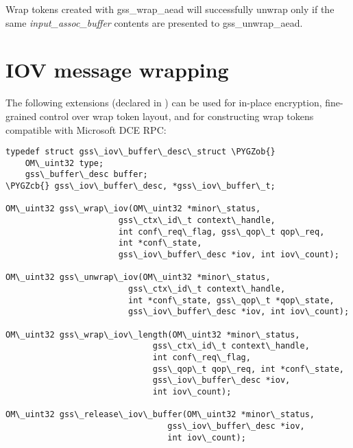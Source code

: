 \documentclass[letterpaper,10pt,english]{sphinxmanual}
\def\PYGZob{\char`\{}
\def\PYGZcb{\char`\}}
\begin{document}
Wrap tokens created with gss\_wrap\_aead will successfully unwrap only
if the same \emph{input\_assoc\_buffer} contents are presented to
gss\_unwrap\_aead.


\section{IOV message wrapping}
\label{appdev/gssapi:iov-message-wrapping}
The following extensions (declared in ) can
be used for in-place encryption, fine-grained control over wrap token
layout, and for constructing wrap tokens compatible with Microsoft DCE
RPC:

\begin{Verbatim}[commandchars=\\\{\}]
typedef struct gss\_iov\_buffer\_desc\_struct \PYGZob{}
    OM\_uint32 type;
    gss\_buffer\_desc buffer;
\PYGZcb{} gss\_iov\_buffer\_desc, *gss\_iov\_buffer\_t;

OM\_uint32 gss\_wrap\_iov(OM\_uint32 *minor\_status,
                       gss\_ctx\_id\_t context\_handle,
                       int conf\_req\_flag, gss\_qop\_t qop\_req,
                       int *conf\_state,
                       gss\_iov\_buffer\_desc *iov, int iov\_count);

OM\_uint32 gss\_unwrap\_iov(OM\_uint32 *minor\_status,
                         gss\_ctx\_id\_t context\_handle,
                         int *conf\_state, gss\_qop\_t *qop\_state,
                         gss\_iov\_buffer\_desc *iov, int iov\_count);

OM\_uint32 gss\_wrap\_iov\_length(OM\_uint32 *minor\_status,
                              gss\_ctx\_id\_t context\_handle,
                              int conf\_req\_flag,
                              gss\_qop\_t qop\_req, int *conf\_state,
                              gss\_iov\_buffer\_desc *iov,
                              int iov\_count);

OM\_uint32 gss\_release\_iov\_buffer(OM\_uint32 *minor\_status,
                                 gss\_iov\_buffer\_desc *iov,
                                 int iov\_count);
\end{Verbatim}
\end{document}
